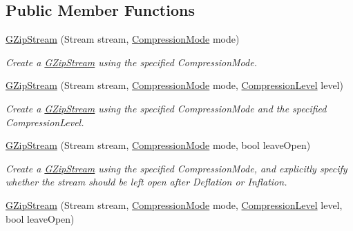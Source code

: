 \subsection*{Public Member Functions}
\begin{DoxyCompactItemize}
\item 
\mbox{\hyperlink{class_super_tiled2_unity_1_1_ionic_1_1_zlib_1_1_g_zip_stream_a509b4683754c1e03e277c5688b75cf54}{G\+Zip\+Stream}} (Stream stream, \mbox{\hyperlink{namespace_super_tiled2_unity_1_1_ionic_1_1_zlib_ad5b7635d92497e1c905e5de82eb1c6b1}{Compression\+Mode}} mode)
\begin{DoxyCompactList}\small\item\em Create a {\ttfamily \mbox{\hyperlink{class_super_tiled2_unity_1_1_ionic_1_1_zlib_1_1_g_zip_stream}{G\+Zip\+Stream}}} using the specified {\ttfamily Compression\+Mode}. \end{DoxyCompactList}\item 
\mbox{\hyperlink{class_super_tiled2_unity_1_1_ionic_1_1_zlib_1_1_g_zip_stream_a0c3a1b84d1e634a7405d40ff529330ca}{G\+Zip\+Stream}} (Stream stream, \mbox{\hyperlink{namespace_super_tiled2_unity_1_1_ionic_1_1_zlib_ad5b7635d92497e1c905e5de82eb1c6b1}{Compression\+Mode}} mode, \mbox{\hyperlink{namespace_super_tiled2_unity_1_1_ionic_1_1_zlib_a20f6771804996c363f454ad9765cd7db}{Compression\+Level}} level)
\begin{DoxyCompactList}\small\item\em Create a {\ttfamily \mbox{\hyperlink{class_super_tiled2_unity_1_1_ionic_1_1_zlib_1_1_g_zip_stream}{G\+Zip\+Stream}}} using the specified {\ttfamily Compression\+Mode} and the specified {\ttfamily Compression\+Level}. \end{DoxyCompactList}\item 
\mbox{\hyperlink{class_super_tiled2_unity_1_1_ionic_1_1_zlib_1_1_g_zip_stream_af94d6e6357a0e88fb3c237388574efeb}{G\+Zip\+Stream}} (Stream stream, \mbox{\hyperlink{namespace_super_tiled2_unity_1_1_ionic_1_1_zlib_ad5b7635d92497e1c905e5de82eb1c6b1}{Compression\+Mode}} mode, bool leave\+Open)
\begin{DoxyCompactList}\small\item\em Create a {\ttfamily \mbox{\hyperlink{class_super_tiled2_unity_1_1_ionic_1_1_zlib_1_1_g_zip_stream}{G\+Zip\+Stream}}} using the specified {\ttfamily Compression\+Mode}, and explicitly specify whether the stream should be left open after Deflation or Inflation. \end{DoxyCompactList}\item 
\mbox{\hyperlink{class_super_tiled2_unity_1_1_ionic_1_1_zlib_1_1_g_zip_stream_a3cb29104487c56e6f58a24ce79ee546d}{G\+Zip\+Stream}} (Stream stream, \mbox{\hyperlink{namespace_super_tiled2_unity_1_1_ionic_1_1_zlib_ad5b7635d92497e1c905e5de82eb1c6b1}{Compression\+Mode}} mode, \mbox{\hyperlink{namespace_super_tiled2_unity_1_1_ionic_1_1_zlib_a20f6771804996c363f454ad9765cd7db}{Compression\+Level}} level, bool leave\+Open)

\end{DoxyCompactItemize}
